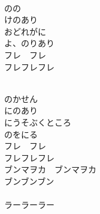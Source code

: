 \documentclass[10pt,b5j]{tarticle} %
\begin{document}
\vspace{1.5em} %
\newcommand{\linespace}{0.5em} %
\newcommand{\blocksize}{0.5\hsize} %
\newcommand{\itemmargin}{3em} %
\begin{enumerate} %
    \setlength{\itemindent}{\itemmargin} %
    \begin{minipage}[c]{\blocksize}
    
        \vspace{\linespace}
        \item~\\
        のの\\
        けのあり\\
        おどれがに\\
        よ、のりあり\\
        フレ　フレ\\
        フレフレフレ
        
    \end{minipage}
    \begin{minipage}[c]{\blocksize}
        
        \vspace{\linespace}
        \item~\\
        のかせん\\
        にのあり\\
        にうそぶくところ\\
        のをにる\\
        フレ　フレ\\
        フレフレフレ\\
        ブンマヲカ　ブンマヲカ\\
        ブンブンブン\\
        　\\
        ラーラーラー
        

\end{minipage}
\end{enumerate}
\end{document}
